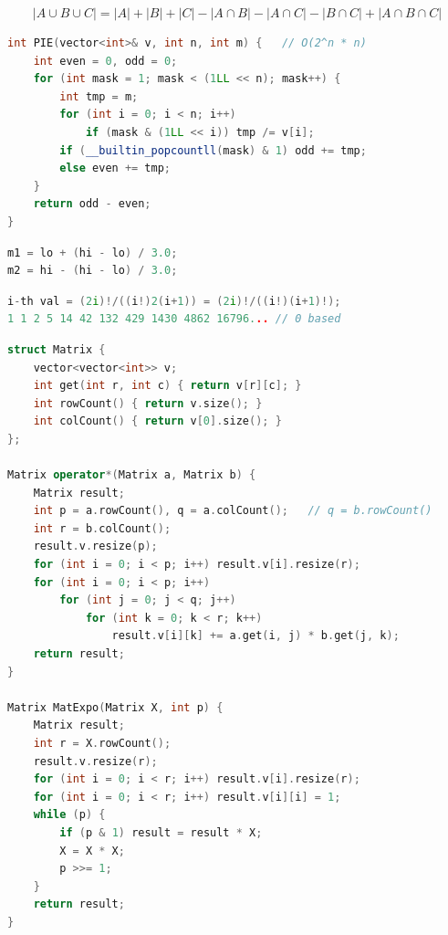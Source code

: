 \[|A \cup B \cup C| = |A| + |B| + |C| - |A \cap B| - |A \cap C| - |B \cap C| + |A \cap B \cap C|\]
\begin{lstlisting}[language=C++]
int PIE(vector<int>& v, int n, int m) {   // O(2^n * n)
    int even = 0, odd = 0;
    for (int mask = 1; mask < (1LL << n); mask++) {
        int tmp = m;
        for (int i = 0; i < n; i++)
            if (mask & (1LL << i)) tmp /= v[i];
        if (__builtin_popcountll(mask) & 1) odd += tmp;
        else even += tmp;
    }
    return odd - even;
}
\end{lstlisting}

\begin{lstlisting}[language=C++]
m1 = lo + (hi - lo) / 3.0;
m2 = hi - (hi - lo) / 3.0;
\end{lstlisting}

\begin{lstlisting}[language=C++]
i-th val = (2i)!/((i!)2(i+1)) = (2i)!/((i!)(i+1)!);
1 1 2 5 14 42 132 429 1430 4862 16796... // 0 based 
\end{lstlisting}

\begin{lstlisting}[language=C++]
struct Matrix {
    vector<vector<int>> v;
    int get(int r, int c) { return v[r][c]; }
    int rowCount() { return v.size(); }
    int colCount() { return v[0].size(); }
};

Matrix operator*(Matrix a, Matrix b) {
    Matrix result;
    int p = a.rowCount(), q = a.colCount();   // q = b.rowCount()
    int r = b.colCount();
    result.v.resize(p);
    for (int i = 0; i < p; i++) result.v[i].resize(r);
    for (int i = 0; i < p; i++)
        for (int j = 0; j < q; j++)
            for (int k = 0; k < r; k++)
                result.v[i][k] += a.get(i, j) * b.get(j, k);
    return result;
}

Matrix MatExpo(Matrix X, int p) {
    Matrix result;
    int r = X.rowCount();
    result.v.resize(r);
    for (int i = 0; i < r; i++) result.v[i].resize(r);
    for (int i = 0; i < r; i++) result.v[i][i] = 1;
    while (p) {
        if (p & 1) result = result * X;
        X = X * X;
        p >>= 1;
    }
    return result;
}
\end{lstlisting}

